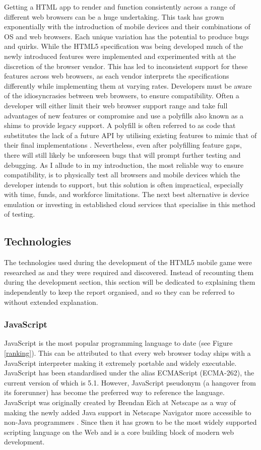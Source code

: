 \documentclass[final]{cmpreport}
\begin{document}
Getting a HTML app to render and function consistently across a range of different web browsers can be a huge undertaking. This task has grown exponentially with the introduction of mobile devices and their combinations of OS and web browsers. Each unique variation has the potential to produce bugs and quirks. While the HTML5 specification was being developed much of the newly introduced features were implemented and experimented with at the discretion of the browser vendor. This has led to inconsistent support for these features across web browsers, as each vendor interprets the specifications differently while implementing them at varying rates. Developers must be aware of the idiosyncrasies between web browsers, to ensure compatibility. Often a developer will either limit their web browser support range and take full advantages of new features or compromise and use a polyfills also known as a shims to provide legacy support. A polyfill is often referred to as code that substitutes the lack of a future API by utilising existing features to mimic that of their final implementations \cite{Lawson}. Nevertheless, even after polyfilling feature gaps, there will still likely be unforeseen bugs that will prompt further testing and debugging. As I allude to in my introduction, the most reliable way to ensure compatibility, is to physically test all browsers and mobile devices which the developer intends to support, but this solution is often impractical, especially with time, funds, and workforce limitations. The next best alternative is device emulation or investing in established cloud services that specialise in this method of testing.

\subsection{Technologies}
The technologies used during the development of the HTML5 mobile game were researched as and they were required and discovered. Instead of recounting them during the development section, this section will be dedicated to explaining them independently to keep the report organised, and so they can be referred to without extended explanation.

\subsubsection{JavaScript}
JavaScript is the most popular programming language to date (see Figure \ref{ranking}). This can be attributed to that every web browser today ships with a JavaScript interpreter making it extremely portable and widely executable. JavaScript has been standardised under the alias ECMAScript (ECMA-262), the current version of which is 5.1\footnotemark. However, JavaScript pseudonym (a hangover from its forerunner) has become the preferred way to reference the language. JavaScript was originally created by Brendan Eich at Netscape as a way of making the newly added Java support in Netscape Navigator more accessible to non-Java programmers \citep{Champeon}. Since then it has grown to be the most widely supported scripting language on the Web and is a core building block of modern web development.
\end{document}
